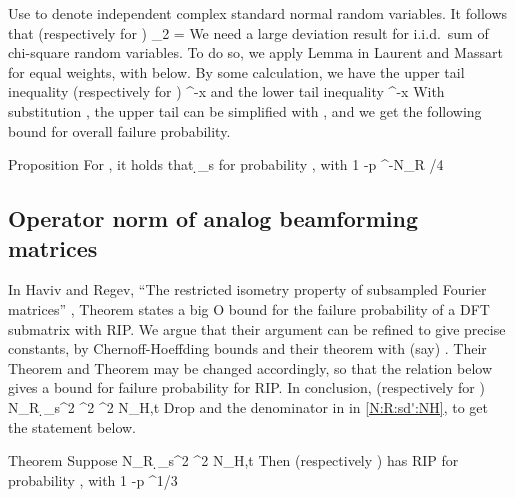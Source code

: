 Use  to denote independent complex standard normal random variables.
It follows that (respectively for )
%
 {
 _2
= 
}
%
We need a large deviation result for i.i.d.\ sum of chi-square random variables.
To do so, we apply Lemma  in Laurent and Massart \cite {LaM00} for equal weights, with  below.
By some calculation, we have the upper tail inequality (respectively for )
%
 {
 
\leq {} ^{-x} 
}
%
and the lower tail inequality
%
 {
 
\leq {} ^{-x} 
}
%
With substitution , the upper tail can be simplified with , and we get the following bound for overall failure probability.

\Result
{Proposition}
{
For , it holds that
%
 {
\geq \d_s 
}
for probability , with
 {
1 -p
  ^{-N_R  /4} 
}
}

\subsection {Operator norm of analog beamforming matrices}

In Haviv and Regev, ``The restricted isometry property of subsampled Fourier matrices'' \cite {KlM17}, Theorem  states a big O bound for the failure probability of a DFT submatrix with  RIP.
We argue that their argument can be refined to give precise constants, by Chernoff-Hoeffding bounds and their theorem  with (say) .
Their Theorem  and Theorem  may be changed accordingly, so that the relation below gives a bound for failure probability for  RIP.
In conclusion, (respectively for )
%
 {
N_R
\geq {} {\d_s^2} ^2 ^2 \log N_{H,t}
}
%
Drop  and the denominator  in  in \eqref {N:R:sd':NH}, to get the statement below.

\Result
{Theorem}
{
Suppose
%
 {
N_R
\geq {} {\d_s^2} ^2 \log N_{H,t}
}
%
Then  (respectively ) has  RIP for probability , with
 {
1 -p
\leq {} ^{1/3} 
}
}



